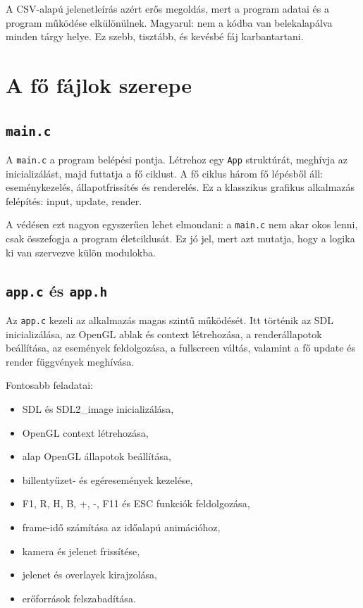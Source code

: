 \documentclass[12pt,a4paper]{article}
\newcommand{\code}[1]{\texttt{#1}}
\begin{document}
A CSV-alapú jelenetleírás azért erős megoldás, mert a program adatai és a program működése elkülönülnek. Magyarul: nem a kódba van belekalapálva minden tárgy helye. Ez szebb, tisztább, és kevésbé fáj karbantartani.

\section{A fő fájlok szerepe}

\subsection{\code{main.c}}

A \code{main.c} a program belépési pontja. Létrehoz egy \code{App} struktúrát, meghívja az inicializálást, majd futtatja a fő ciklust. A fő ciklus három fő lépésből áll: eseménykezelés, állapotfrissítés és renderelés. Ez a klasszikus grafikus alkalmazás felépítés: input, update, render.

A védésen ezt nagyon egyszerűen lehet elmondani: a \code{main.c} nem akar okos lenni, csak összefogja a program életciklusát. Ez jó jel, mert azt mutatja, hogy a logika ki van szervezve külön modulokba.

\subsection{\code{app.c} és \code{app.h}}

Az \code{app.c} kezeli az alkalmazás magas szintű működését. Itt történik az SDL inicializálása, az OpenGL ablak és context létrehozása, a renderállapotok beállítása, az események feldolgozása, a fullscreen váltás, valamint a fő update és render függvények meghívása.

Fontosabb feladatai:

\begin{itemize}
    \item SDL és SDL2\_image inicializálása,
    \item OpenGL context létrehozása,
    \item alap OpenGL állapotok beállítása,
    \item billentyűzet- és egéresemények kezelése,
    \item F1, R, H, B, +, -, F11 és ESC funkciók feldolgozása,
    \item frame-idő számítása az időalapú animációhoz,
    \item kamera és jelenet frissítése,
    \item jelenet és overlayek kirajzolása,
    \item erőforrások felszabadítása.
\end{itemize}
\end{document}
